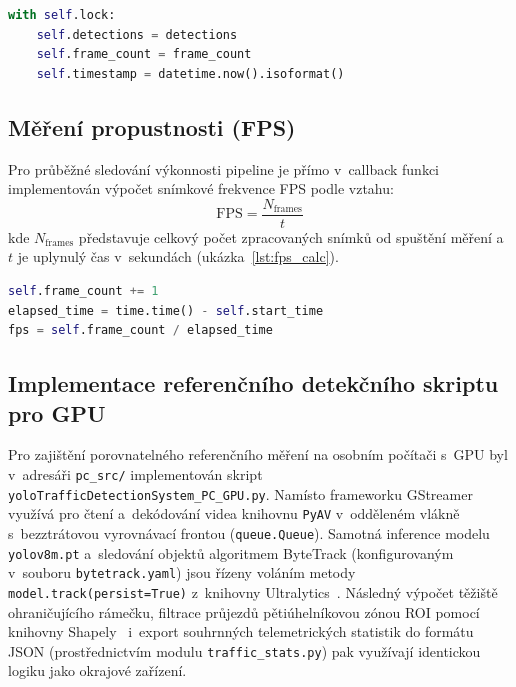 \begin{lstlisting}[language=Python, caption={Vláknově bezpečná aktualizace detekčních dat.}]
with self.lock:
    self.detections = detections
    self.frame_count = frame_count
    self.timestamp = datetime.now().isoformat()
\end{lstlisting}

\subsection{Měření propustnosti (FPS)}


Pro průběžné sledování výkonnosti pipeline je přímo v~callback funkci implementován výpočet snímkové frekvence FPS podle vztahu:
\[
\text{FPS} = \frac{N_{\text{frames}}}{t}
\]
kde $N_{\text{frames}}$ představuje celkový počet zpracovaných snímků od spuštění měření a $t$ je uplynulý čas v~sekundách (ukázka~\ref{lst:fps_calc}).

\newpage

\begin{lstlisting}[language=Python, caption={Průběžný výpočet FPS během běhu pipeline.}, label={lst:fps_calc}]
self.frame_count += 1
elapsed_time = time.time() - self.start_time
fps = self.frame_count / elapsed_time
\end{lstlisting}

\subsection{Implementace referenčního detekčního skriptu pro GPU}
Pro zajištění porovnatelného referenčního měření na osobním počítači s~GPU byl v~adresáři \texttt{pc\_src/} implementován skript \texttt{yoloTrafficDetectionSystem\_PC\_GPU.py}. Namísto frameworku GStreamer využívá pro čtení a~dekódování videa knihovnu \texttt{PyAV} v~odděleném vlákně s~bezztrátovou vyrovnávací frontou (\texttt{queue.Queue}). Samotná inference modelu \texttt{yolov8m.pt} a~sledování objektů algoritmem ByteTrack (konfigurovaným v~souboru \texttt{bytetrack.yaml}) jsou řízeny voláním metody \texttt{model.track(persist=True)} z~knihovny Ultralytics~\cite{ultralytics_yolov8_docs}. Následný výpočet těžiště ohraničujícího rámečku, filtrace průjezdů pětiúhelníkovou zónou ROI pomocí knihovny Shapely~\cite{shapely_docs} i~export souhrnných telemetrických statistik do formátu \acs{JSON} (prostřednictvím modulu \texttt{traffic\_stats.py}) pak využívají identickou logiku jako okrajové zařízení.

